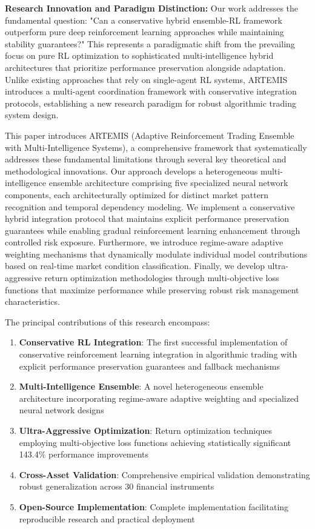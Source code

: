 \documentclass[10pt,twocolumn]{article}
\begin{document}
\textbf{Research Innovation and Paradigm Distinction:} Our work addresses the fundamental question: "Can a conservative hybrid ensemble-RL framework outperform pure deep reinforcement learning approaches while maintaining stability guarantees?" This represents a paradigmatic shift from the prevailing focus on pure RL optimization to sophisticated multi-intelligence hybrid architectures that prioritize performance preservation alongside adaptation. Unlike existing approaches that rely on single-agent RL systems, ARTEMIS introduces a multi-agent coordination framework with conservative integration protocols, establishing a new research paradigm for robust algorithmic trading system design.

This paper introduces ARTEMIS (Adaptive Reinforcement Trading Ensemble with Multi-Intelligence Systems), a comprehensive framework that systematically addresses these fundamental limitations through several key theoretical and methodological innovations. Our approach develops a heterogeneous multi-intelligence ensemble architecture comprising five specialized neural network components, each architecturally optimized for distinct market pattern recognition and temporal dependency modeling. We implement a conservative hybrid integration protocol that maintains explicit performance preservation guarantees while enabling gradual reinforcement learning enhancement through controlled risk exposure. Furthermore, we introduce regime-aware adaptive weighting mechanisms that dynamically modulate individual model contributions based on real-time market condition classification. Finally, we develop ultra-aggressive return optimization methodologies through multi-objective loss functions that maximize performance while preserving robust risk management characteristics.

The principal contributions of this research encompass:

\begin{enumerate}[itemsep=2pt]
\item \textbf{Conservative RL Integration}: The first successful implementation of conservative reinforcement learning integration in algorithmic trading with explicit performance preservation guarantees and fallback mechanisms
\item \textbf{Multi-Intelligence Ensemble}: A novel heterogeneous ensemble architecture incorporating regime-aware adaptive weighting and specialized neural network designs
\item \textbf{Ultra-Aggressive Optimization}: Return optimization techniques employing multi-objective loss functions achieving statistically significant 143.4\% performance improvements
\item \textbf{Cross-Asset Validation}: Comprehensive empirical validation demonstrating robust generalization across 30 financial instruments
\item \textbf{Open-Source Implementation}: Complete implementation facilitating reproducible research and practical deployment
\end{enumerate}
\end{document}
